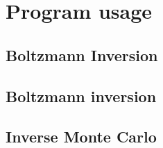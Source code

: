 \chapter{Program usage}
\section{Boltzmann Inversion}

\section{Boltzmann inversion}

\section{Inverse Monte Carlo}

